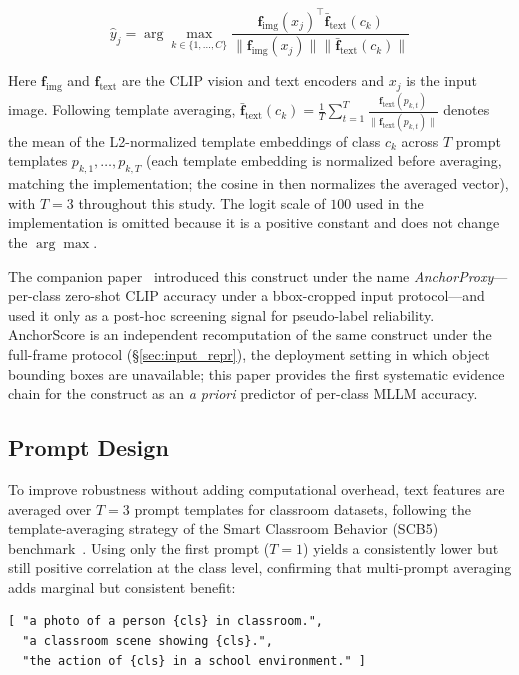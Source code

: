 \documentclass[a4paper,fleqn]{cas-sc}
\begin{document}
\begin{equation}
\hat{y}_j = \arg\max_{k \in \{1,\dots,C\}} \frac{\mathbf{f}_{\text{img}}(x_j)^\top \bar{\mathbf{f}}_{\text{text}}(c_k)}{\|\mathbf{f}_{\text{img}}(x_j)\| \|\bar{\mathbf{f}}_{\text{text}}(c_k)\|}
\label{eq:clip_pred}
\end{equation}

Here $\mathbf{f}_{\text{img}}$ and $\mathbf{f}_{\text{text}}$ are the CLIP vision and text encoders and $x_j$ is the input image. Following template averaging, $\bar{\mathbf{f}}_{\text{text}}(c_k) = \frac{1}{T}\sum_{t=1}^{T}\frac{\mathbf{f}_{\text{text}}(p_{k,t})}{\|\mathbf{f}_{\text{text}}(p_{k,t})\|}$ denotes the mean of the L2-normalized template embeddings of class $c_k$ across $T$ prompt templates $p_{k,1}, \dots, p_{k,T}$ (each template embedding is normalized before averaging, matching the implementation; the cosine in  then normalizes the averaged vector), with $T=3$ throughout this study. The logit scale of $100$ used in the implementation is omitted because it is a positive constant and does not change the $\arg\max$.

The companion paper~\cite{ma2026agreement} introduced this construct under the name \emph{AnchorProxy}---per-class zero-shot CLIP accuracy under a bbox-cropped input protocol---and used it only as a post-hoc screening signal for pseudo-label reliability. AnchorScore is an independent recomputation of the same construct under the full-frame protocol (\S\ref{sec:input_repr}), the deployment setting in which object bounding boxes are unavailable; this paper provides the first systematic evidence chain for the construct as an \emph{a priori} predictor of per-class MLLM accuracy.

\subsection{Prompt Design}

To improve robustness without adding computational overhead, text features are averaged over $T=3$ prompt templates for classroom datasets, following the template-averaging strategy of the Smart Classroom Behavior (SCB5) benchmark~\cite{scb_dataset}. Using only the first prompt ($T=1$) yields a consistently lower but still positive correlation at the class level, confirming that multi-prompt averaging adds marginal but consistent benefit:

{\footnotesize
\begin{verbatim}
[ "a photo of a person {cls} in classroom.",
  "a classroom scene showing {cls}.",
  "the action of {cls} in a school environment." ]
\end{verbatim}}
\end{document}
